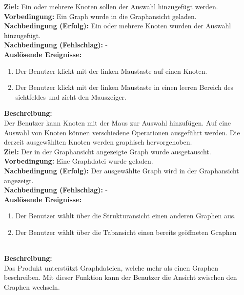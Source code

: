 \label{fa:selekt_knoten}
\textbf{Ziel:} Ein oder mehrere Knoten sollen der Auswahl hinzugefügt werden.\\
\textbf{Vorbedingung:} Ein Graph wurde in die Graphansicht geladen.\\
\textbf{Nachbedingung (Erfolg):} Ein oder mehrere Knoten wurden der Auswahl hinzugefügt.\\
\textbf{Nachbedingung (Fehlschlag):} -\\
\textbf{Auslösende Ereignisse:}
\begin{enumerate}[nolistsep, label=(\alph*)]
  \item Der Benutzer klickt mit der linken Maustaste auf einen Knoten.
  \item Der Benutzer klickt mit der linken Maustaste in einen leeren Bereich des \gls{sichtfeld}es und zieht den Mauszeiger.
\end{enumerate}
\textbf{Beschreibung:}\\
Der Benutzer kann Knoten mit der Maus zur Auswahl hinzufügen.
Auf eine Auswahl von Knoten können verschiedene Operationen ausgeführt werden. %
Die derzeit ausgewählten Knoten werden graphisch hervorgehoben.\\

\label{fa:graphwechsel}
\textbf{Ziel:} Der in der Graphansicht angezeigte Graph wurde ausgetauscht. \\
\textbf{Vorbedingung:} Eine Graphdatei wurde geladen.\\
\textbf{Nachbedingung (Erfolg):} Der ausgewählte Graph wird in der Graphansicht angezeigt.\\
\textbf{Nachbedingung (Fehlschlag):} -\\
\textbf{Auslösende Ereignisse:}
\begin{enumerate}[nolistsep, label=(\alph*)]
  \item Der Benutzer wählt über die Strukturansicht einen anderen Graphen aus.
  \item Der Benutzer wählt über die Tabansicht einen bereits geöffneten Graphen %
\end{enumerate}\\
\textbf{Beschreibung:}\\
Das Produkt unterstützt Graphdateien, welche mehr als einen Graphen beschreiben.
Mit dieser Funktion kann der Benutzer die Ansicht zwischen den Graphen wechseln.

